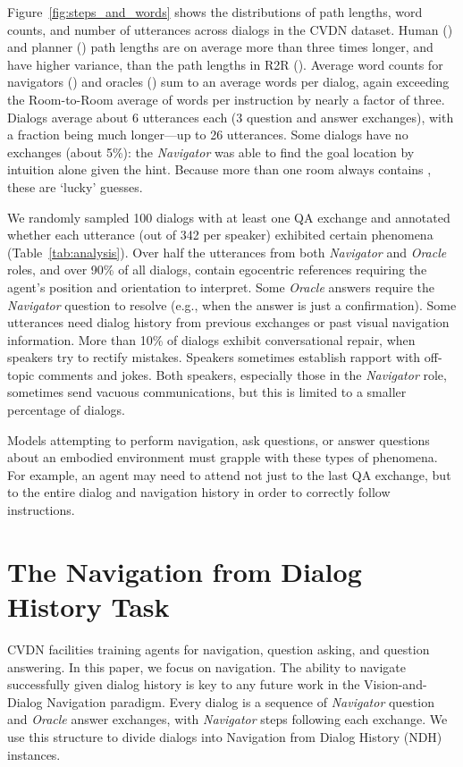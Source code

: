 \documentclass{article}
\newcommand{\dataset}{CVDN}
\newcommand{\taskfull}{Navigation from Dialog History}
\newcommand{\task}{NDH}
\newcommand{\nav}{\textit{Navigator}}
\newcommand{\ora}{\textit{Oracle}}
\begin{document}
Figure~\ref{fig:steps_and_words} shows the distributions of path lengths, word counts, and number of utterances across dialogs in the \dataset{} dataset.
Human () and planner () path lengths are on average more than three times longer, and have higher variance, than the path lengths in R2R ().
Average word counts for navigators () and oracles () sum to an average  words per dialog, again exceeding the Room-to-Room average of  words per instruction by nearly a factor of three.
Dialogs average about 6 utterances each (3 question and answer exchanges), with a fraction being much longer---up to 26 utterances.
Some dialogs have no exchanges (about 5\%): the \nav{} was able to find the goal location by intuition alone given the hint.
Because more than one room always contains , these are `lucky' guesses.

We randomly sampled 100 dialogs with at least one QA exchange and annotated whether each utterance (out of 342 per speaker) exhibited certain phenomena (Table~\ref{tab:analysis}).
Over half the utterances from both \nav{} and \ora{} roles, and over 90\% of all dialogs, contain egocentric references requiring the agent's position and orientation to interpret.
Some \ora{} answers require the \nav{} question to resolve (e.g., when the answer is just a confirmation).
Some utterances need dialog history from previous exchanges or past visual navigation information.
More than 10\% of dialogs exhibit conversational repair, when speakers try to rectify mistakes.
Speakers sometimes establish rapport with off-topic comments and jokes.
Both speakers, especially those in the \nav{} role, sometimes send vacuous communications, but this is limited to a smaller percentage of dialogs.

Models attempting to perform navigation, ask questions, or answer questions about an embodied environment must grapple with these types of phenomena.
For example, an agent may need to attend not just to the last QA exchange, but to the entire dialog and navigation history in order to correctly follow instructions.
 
\section{The \taskfull{} Task}
\label{sec:task}

\dataset{} facilities training agents for navigation, question asking, and question answering.
In this paper, we focus on navigation.
The ability to navigate successfully given dialog history is key to any future work in the Vision-and-Dialog Navigation paradigm.
Every dialog is a sequence of \nav{} question and \ora{} answer exchanges, with \nav{} steps following each exchange.
We use this structure to divide dialogs into \taskfull{} (\task{}) instances.
\end{document}
